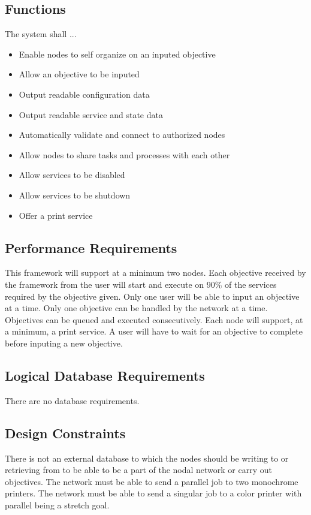 \documentclass[draftclsnofoot, onecolumn, compsoc, 10pt]{IEEEtran}
\begin{document}
\subsection{Functions}
The system shall ...
\begin{itemize}
\item Enable nodes to self organize on an inputed objective
\item Allow an objective to be inputed
\item Output readable configuration data
\item Output readable service and state data
\item Automatically validate and connect to authorized nodes
\item Allow nodes to share tasks and processes with each other
\item Allow services to be disabled 
\item Allow services to be shutdown
\item Offer a print service
\end{itemize}

\subsection{Performance Requirements}
This framework will support at a minimum two nodes. Each objective received by the framework from the user will start and execute on 90\% of the services required by the objective given. Only one user will be able to input an objective at a time. Only one objective can be handled by the network at a time. Objectives can be queued and executed consecutively. Each node will support, at a minimum, a print service. A user will have to wait for an objective to complete before inputing a new objective. 

\subsection{Logical Database Requirements}
There are no database requirements. 

\subsection{Design Constraints}
There is not an external database to which the nodes should be writing to or retrieving from to be able to be a part of the nodal network or carry out objectives. The network must be able to send a parallel job to two monochrome printers. The network must be able to send a singular job to a color printer with parallel being a stretch goal.
\end{document}

